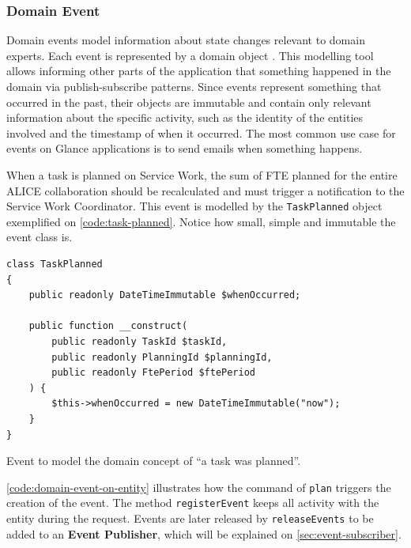 \subsubsection{Domain Event}

Domain events model information about state changes relevant to domain experts. Each event is represented by a domain object \cite{ddd-reference} \cite{ddd-red-book}. This modelling tool allows informing other parts of the application that something happened in the domain via publish-subscribe patterns. Since events represent something that occurred in the past, their objects are immutable and contain only relevant information about the specific activity, such as the identity of the entities involved and the timestamp of when it occurred. The most common use case for events on Glance applications is to send emails when something happens.

When a task is planned on Service Work, the sum of FTE planned for the entire ALICE collaboration should be recalculated and must trigger a notification to the Service Work Coordinator. This event is modelled by the \texttt{TaskPlanned} object exemplified on \autoref{code:task-planned}. Notice how small, simple and immutable the event class is.

\begin{listing}[htbp]
\begin{verbatim}
class TaskPlanned
{
	public readonly DateTimeImmutable $whenOccurred;

	public function __construct(
		public readonly TaskId $taskId,
		public readonly PlanningId $planningId,
		public readonly FtePeriod $ftePeriod
	) {
		$this->whenOccurred = new DateTimeImmutable("now");
	}
}
\end{verbatim}
\caption{Event to model the domain concept of ``a task was planned''.}
\label{code:task-planned}
\end{listing}

\autoref{code:domain-event-on-entity} illustrates how the command of \texttt{plan} triggers the creation of the event. The method \texttt{registerEvent} keeps all activity with the entity during the request. Events are later released by \texttt{releaseEvents} to be added to an \textbf{Event Publisher}, which will be explained on \autoref{sec:event-subscriber}.

